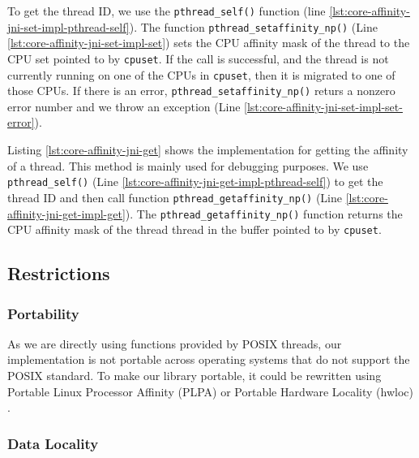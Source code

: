 To get the thread ID, we use the \lstinline!pthread_self()! function
(line \ref{lst:core-affinity-jni-set-impl-pthread-self}). The function
\lstinline!pthread_setaffinity_np()! (Line
\ref{lst:core-affinity-jni-set-impl-set}) sets the CPU affinity mask
of the thread to the CPU set pointed to by \lstinline!cpuset!.  If the
call is successful, and the thread is not currently running on one of
the CPUs in \lstinline!cpuset!, then it is migrated to one of those
CPUs. If there is an error, \lstinline!pthread_setaffinity_np()!
returs a nonzero error number and we throw an exception (Line
\ref{lst:core-affinity-jni-set-impl-set-error}).

Listing \ref{lst:core-affinity-jni-get} shows the implementation for
getting the affinity of a thread. This method is mainly used for
debugging purposes. We use \lstinline!pthread_self()! (Line
\ref{lst:core-affinity-jni-get-impl-pthread-self}) to get the thread
ID and then call function \lstinline!pthread_getaffinity_np()!  (Line
\ref{lst:core-affinity-jni-get-impl-get}). The
\lstinline!pthread_getaffinity_np()! function returns the CPU affinity
mask of the thread thread in the buffer pointed to by
\lstinline!cpuset!.



\subsection{Restrictions}
\label{sec:locality-implementation-core-affinity-restrictions}

\subsubsection{Portability}

As we are directly using functions provided by POSIX threads, our
implementation is not portable across operating systems that do not
support the POSIX standard. To make our library portable, it could be
rewritten using Portable Linux Processor Affinity (PLPA)
\cite{OpenMPI2010a} or Portable Hardware Locality (hwloc)
\cite{OpenMPI2010}.

\subsubsection{Data Locality}

